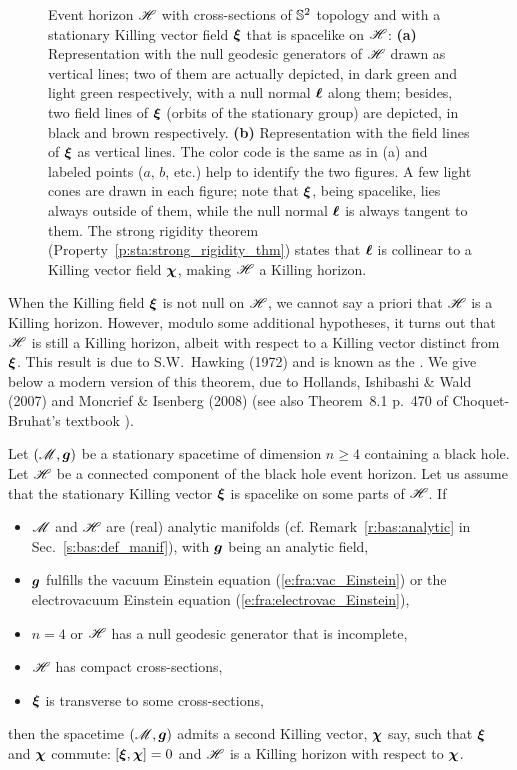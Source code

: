 \begin{figure}
\caption[]{\label{f:sta:rot_horizon} \footnotesize
Event horizon $\mathscr{H}$ with cross-sections of $\mathbb{S}^2$ topology
and with a stationary Killing vector field $\bm{\xi}$ that is
spacelike on $\mathscr{H}$:
\textbf{(a)} Representation with the null geodesic generators of $\mathscr{H}$ drawn as vertical
lines; two of them are actually depicted, in dark green and light green
respectively, with a null normal $\bm{\ell}$ along them; besides,
two field lines of $\bm{\xi}$
(orbits of the stationary group) are depicted, in black and brown
respectively.
\textbf{(b)} Representation with the field lines of $\bm{\xi}$ as vertical lines.
The color code is the same as in (a) and
labeled points ($a$, $b$, etc.) help to identify
the two figures. A few light cones are drawn in each figure; note that $\bm{\xi}$,
being spacelike,
lies always outside of them,
while the null normal $\bm{\ell}$ is always tangent to them.
The strong rigidity theorem (Property~\ref{p:sta:strong_rigidity_thm}) states that
$\bm{\ell}$ is collinear to a Killing vector field $\bm{\chi}$, making $\mathscr{H}$
a Killing horizon.}
\end{figure}

When the Killing field $\bm{\xi}$ is not null on $\mathscr{H}$, we cannot say a priori
that $\mathscr{H}$ is a Killing horizon. However, modulo some additional hypotheses,
it turns out that $\mathscr{H}$ is still a Killing horizon, albeit with
respect to a Killing vector distinct from $\bm{\xi}$. This result is due to
S.W.~Hawking (1972)
\cite{Hawki72,HawkiE73} and is known as the
.
We give below a modern version of this theorem, due to
Hollands, Ishibashi \& Wald (2007) \cite{HollaIW07}
and Moncrief \& Isenberg (2008) \cite{MoncrI08} (see also
Theorem~8.1 p.~470 of Choquet-Bruhat's textbook \cite{Choqu09}).

\begin{prop}
\label{p:sta:strong_rigidity_thm}
Let $(\mathscr{M},\bm{g})$ be a stationary spacetime of dimension $n\geq 4$ containing a black
hole. Let $\mathscr{H}$ be a connected component of the black hole event horizon.
Let us assume that the stationary Killing vector $\bm{\xi}$
is spacelike on some parts of $\mathscr{H}$. If
\begin{itemize}
\item $\mathscr{M}$ and $\mathscr{H}$ are (real) analytic manifolds
(cf. Remark~\ref{r:bas:analytic} in Sec.~\ref{s:bas:def_manif}),
with $\bm{g}$ being an analytic field,
\item $\bm{g}$ fulfills the vacuum Einstein equation (\ref{e:fra:vac_Einstein})
or the electrovacuum Einstein equation (\ref{e:fra:electrovac_Einstein}),
\item $n=4$ or $\mathscr{H}$ has a null geodesic generator that is incomplete,
\item $\mathscr{H}$ has compact cross-sections,
\item $\bm{\xi}$ is transverse to some cross-sections,
\end{itemize}
then the spacetime $(\mathscr{M},\bm{g})$ admits a second Killing vector, $\bm{\chi}$
say, such that $\bm{\xi}$ and $\bm{\chi}$ commute: $[\bm{\xi}, \bm{\chi}] = 0$ and
$\mathscr{H}$ is a Killing horizon with respect to $\bm{\chi}$.
\end{prop}

